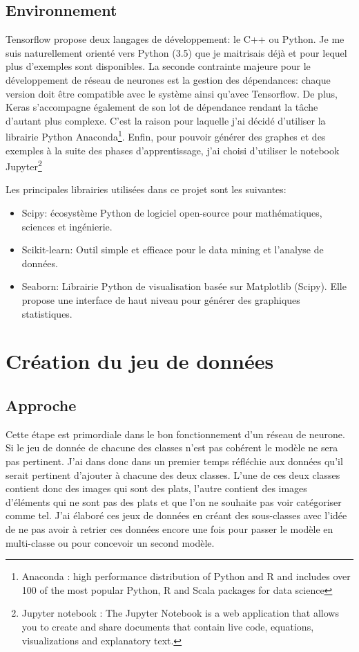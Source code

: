 \documentclass[a4paper,12pt]{report}
\begin{document}
      \subsection{Environnement}
      Tensorflow propose deux langages de développement: le C++ ou Python. Je me suis naturellement orienté vers Python (3.5) que je maitrisais déjà et pour lequel plus d'exemples sont disponibles.
      \medbreak
      La seconde contrainte majeure pour le développement de réseau de neurones est la gestion des dépendances: chaque version doit être compatible avec le système ainsi qu'avec Tensorflow. De plus, Keras s'accompagne également de son lot de dépendance rendant la tâche d'autant plus complexe. C'est la raison pour laquelle j'ai décidé d'utiliser la librairie Python Anaconda\footnote{Anaconda : high performance distribution of Python and R and includes over 100 of the most popular Python, R and Scala packages for data science}.
      \medbreak
      Enfin, pour pouvoir générer des graphes et des exemples à la suite des phases d'apprentissage, j'ai choisi d'utiliser le notebook Jupyter\footnote{Jupyter notebook : The Jupyter Notebook is a web application that allows you to create and share documents that contain live code, equations, visualizations and explanatory text.}
      \bigbreak

      Les principales librairies utilisées dans ce projet sont les suivantes:
      \begin{itemize}
        \item Scipy: écosystème Python de logiciel open-source pour mathématiques, sciences et ingénierie.
        \item Scikit-learn: Outil simple et efficace pour le data mining et l'analyse de données.
        \item Seaborn: Librairie Python de visualisation basée sur Matplotlib (Scipy). Elle propose une interface de haut niveau pour générer des graphiques statistiques.
      \end{itemize}

    \section{Création du jeu de données}

      \subsection{Approche}
      Cette étape est primordiale dans le bon fonctionnement d'un réseau de neurone. Si le jeu de donnée de chacune des classes n'est pas cohérent le modèle ne sera pas pertinent.
      \medbreak
      J'ai dans donc dans un premier temps réfléchie aux données qu'il serait pertinent d'ajouter à chacune des deux classes. L'une de ces deux classes contient donc des images qui sont des plats, l'autre contient des images d'éléments qui ne sont pas des plats et que l'on ne souhaite pas voir catégoriser comme tel.
      \medbreak
      J'ai élaboré ces jeux de données en créant des sous-classes avec l'idée de ne pas avoir à retrier ces données encore une fois pour passer le modèle en multi-classe ou pour concevoir un second modèle.
\end{document}

